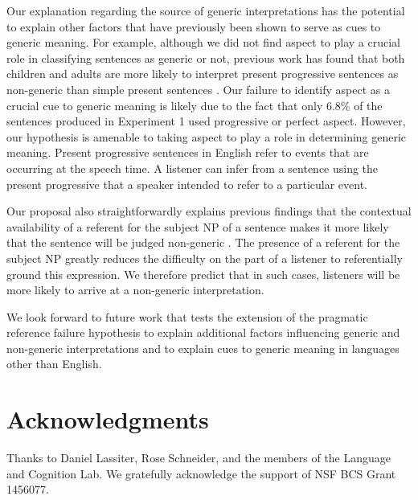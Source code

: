 \documentclass[10pt,letterpaper]{article}
\begin{document}
Our explanation regarding the source of generic interpretations has the potential to explain other factors that have previously been shown to serve as cues to generic meaning. For example, although we did not find aspect to play a crucial role in classifying sentences as generic or not, previous work has found that both children and adults are more likely to interpret present progressive sentences as non-generic than simple present sentences \cite{Cimpian:2011}. Our failure to identify aspect as a crucial cue to generic meaning is likely due to the fact that only 6.8\% of the sentences produced in Experiment 1 used progressive or perfect aspect. However, our hypothesis is amenable to taking aspect to play a role in determining generic meaning. Present progressive sentences in English refer to events that are occurring at the speech time. A listener can infer from a sentence using the present progressive that a speaker intended to refer to a particular event.

Our proposal also straightforwardly explains previous findings that the contextual availability of a referent for the subject NP of a sentence makes it more likely that the sentence will be judged non-generic \cite{Gelman:2003}. The presence of a referent for the subject NP greatly reduces the difficulty on the part of a listener to referentially ground this expression. We therefore predict that in such cases, listeners will be more likely to arrive at a non-generic interpretation. 

We look forward to future work that tests the extension of the pragmatic reference failure hypothesis to explain additional factors influencing generic and non-generic interpretations and to explain cues to generic meaning in languages other than English.

\section{Acknowledgments}

Thanks to Daniel Lassiter, Rose Schneider, and the members of the Language and Cognition Lab. We gratefully acknowledge the support of NSF BCS Grant 1456077.



\setlength{\bibleftmargin}{.125in}
\setlength{\bibindent}{-\bibleftmargin}


\end{document}
